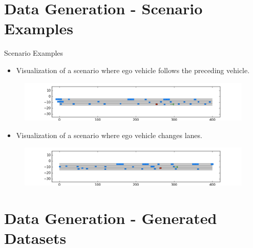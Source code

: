 \documentclass[shortpres]{beamer}
\begin{document}
\section{Data Generation - Scenario Examples}	

\begin{frame}{Scenario Examples}
\begin{itemize}
	\item Visualization of a scenario where ego vehicle follows the preceding vehicle.
\end{itemize}
\begin{figure}[h!]
  \centering
  \includegraphics[width=\textwidth]{MPP_DEU_LocationA-11_T880F7378_T-1}
\end{figure}
\begin{itemize}
	\item Visualization of a scenario where ego vehicle changes lanes.
\end{itemize}
\begin{figure}[h!]
  \centering
  \includegraphics[width=\textwidth]{MPP_DEU_LocationA-11_T1164F9870_T-1}
\end{figure}
\end{frame}

\section{Data Generation - Generated Datasets}	
\end{document}
